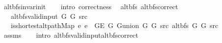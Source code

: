 \begin{isabellebody}
\ alt{\isacharunderscore}{\kern0pt}bfs{\isacharunderscore}{\kern0pt}invar{\isacharunderscore}{\kern0pt}init\isanewline
\ \ \isamarkupfalse%
\ {\isacharparenleft}{\kern0pt}intro\ correctness{\isacharparenright}{\kern0pt}%
\endisatagproof
{\isafoldproof}%
%
\isadelimproof
\isanewline
%
\endisadelimproof
\isanewline
{}\isamarkupfalse%
\ {\isacharparenleft}{\kern0pt}\ alt{\isacharunderscore}{\kern0pt}bfs{\isacharparenright}{\kern0pt}\ alt{\isacharunderscore}{\kern0pt}bfs{\isacharunderscore}{\kern0pt}correct{\isacharcolon}{\kern0pt}\isanewline
\ \ \ {\isachardoublequoteopen}alt{\isacharunderscore}{\kern0pt}bfs{\isacharunderscore}{\kern0pt}valid{\isacharunderscore}{\kern0pt}input{\isacharprime}{\kern0pt}\ G{}\ G{}\ src{\isachardoublequoteclose}\isanewline
\ \ \ {\isachardoublequoteopen}is{\isacharunderscore}{\kern0pt}shortest{\isacharunderscore}{\kern0pt}alt{\isacharunderscore}{\kern0pt}path{\isacharunderscore}{\kern0pt}Map\ {\isacharparenleft}{\kern0pt}{\isasymlambda}e{\isachardot}{\kern0pt}\ e\ {\isasymin}\ G{\isachardot}{\kern0pt}E\ G{}{\isacharparenright}{\kern0pt}\ {\isacharparenleft}{\kern0pt}G{\isachardot}{\kern0pt}union\ G{}\ G{}{\isacharparenright}{\kern0pt}\ src\ {\isacharparenleft}{\kern0pt}alt{\isacharunderscore}{\kern0pt}bfs\ G{}\ G{}\ src{\isacharparenright}{\kern0pt}{\isachardoublequoteclose}\isanewline
%
\isadelimproof
\ \ %
\endisadelimproof
%
\isatagproof
{}\isamarkupfalse%
\ assms\isanewline
\ \ \isamarkupfalse%
\ {\isacharparenleft}{\kern0pt}intro\ alt{\isacharunderscore}{\kern0pt}bfs{\isacharunderscore}{\kern0pt}valid{\isacharunderscore}{\kern0pt}input{\isachardot}{\kern0pt}alt{\isacharunderscore}{\kern0pt}bfs{\isacharunderscore}{\kern0pt}correct{\isacharparenright}{\kern0pt}%
\endisatagproof
{\isafoldproof}%
%
\isadelimproof
\isanewline
%
\endisadelimproof
%
\isadelimtheory
\isanewline
%
\endisadelimtheory
%
\isatagtheory
{}\isamarkupfalse%
%
\endisatagtheory
{\isafoldtheory}%
%
\isadelimtheory
%
\endisadelimtheory
%
\end{isabellebody}%
\endinput
